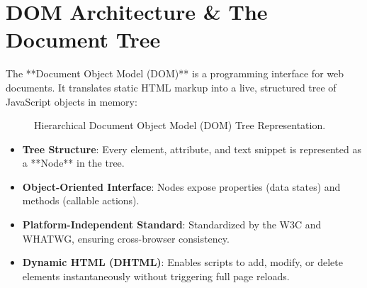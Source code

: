 \section{DOM Architecture \& The Document Tree}

The **Document Object Model (DOM)** is a programming interface for web documents. It translates static HTML markup into a live, structured tree of JavaScript objects in memory:

\begin{figure}[htbp]
\centering
{}
\caption{Hierarchical Document Object Model (DOM) Tree Representation.}
\label{fig:dom-tree}
\end{figure}

\begin{conceptbox}
\begin{itemize}[leftmargin=1.5em]
    \item \textbf{Tree Structure}: Every element, attribute, and text snippet is represented as a **Node** in the tree.
    \item \textbf{Object-Oriented Interface}: Nodes expose properties (data states) and methods (callable actions).
    \item \textbf{Platform-Independent Standard}: Standardized by the W3C and WHATWG, ensuring cross-browser consistency.
    \item \textbf{Dynamic HTML (DHTML)}: Enables scripts to add, modify, or delete elements instantaneously without triggering full page reloads.
\end{itemize}
\end{conceptbox}

